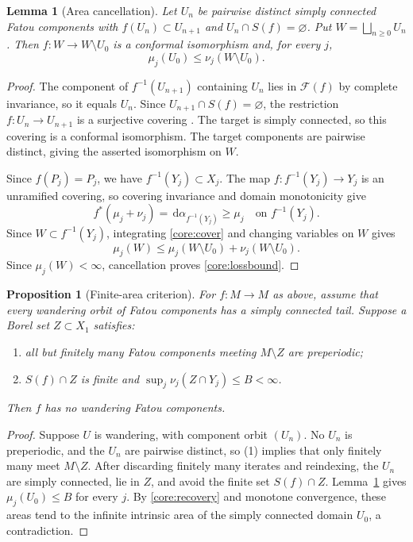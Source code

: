 \documentclass[11pt,reqno]{amsart}
\newcommand{\Fat}{\mathcal F}
\newcommand{\dd}{\,\mathrm d}
\newtheorem{proposition}[theorem]{Proposition}
\newtheorem{lemma}[theorem]{Lemma}
\theoremstyle{definition}
\numberwithin{equation}{section}
\begin{document}
\begin{lemma}[Area cancellation]\label{core:tail}
Let $U_n$ be pairwise distinct simply connected Fatou components with
$f(U_n)\subset U_{n+1}$ and $U_n\cap S(f)=\varnothing$.
Put $W=\bigsqcup_{n\ge0}U_n$. Then $f:W\to W\setminus U_0$ is a
conformal isomorphism and, for every $j$,
\begin{equation}\label{core:lossbound}
 \mu_j(U_0)\le\nu_j(W\setminus U_0).
\end{equation}
\end{lemma}
\begin{proof}
The component of $f^{-1}(U_{n+1})$ containing $U_n$ lies in $\Fat(f)$
by complete invariance, so it equals $U_n$. Since
$U_{n+1}\cap S(f)=\varnothing$, the restriction $f:U_n\to U_{n+1}$
is a surjective covering \cite[Section~3.2]{Sixsmith}.
The target is simply connected, so this covering is a conformal
isomorphism. The target components are pairwise distinct, giving the
asserted isomorphism on $W$.

Since $f(P_j)=P_j$, we have $f^{-1}(Y_j)\subset X_j$.
The map $f:f^{-1}(Y_j)\to Y_j$ is an unramified covering, so
covering invariance and domain monotonicity give
\begin{equation}\label{core:cover}
 f^*(\mu_j+\nu_j)=\dd\alpha_{f^{-1}(Y_j)}\ge\mu_j
 \quad\text{on }f^{-1}(Y_j).
\end{equation}
Since $W\subset f^{-1}(Y_j)$, integrating \eqref{core:cover} and
changing variables on $W$ gives
\[
 \mu_j(W)\le\mu_j(W\setminus U_0)+\nu_j(W\setminus U_0).
\]
Since $\mu_j(W)<\infty$, cancellation proves \eqref{core:lossbound}.
\end{proof}

\begin{proposition}[Finite-area criterion]\label{core:global}
For $f:M\to M$ as above, assume that every wandering orbit of Fatou
components has a simply connected tail. Suppose a Borel set
$Z\subset X_1$ satisfies:
\begin{enumerate}
 \item all but finitely many Fatou components meeting $M\setminus Z$
 are preperiodic;
 \item $S(f)\cap Z$ is finite and
 $\sup_j\nu_j(Z\cap Y_j)\le B<\infty$.
\end{enumerate}
Then $f$ has no wandering Fatou components.
\end{proposition}
\begin{proof}
Suppose $U$ is wandering, with component orbit $(U_n)$.
No $U_n$ is preperiodic, and the $U_n$ are pairwise distinct, so (1)
implies that only finitely many meet $M\setminus Z$.
After discarding finitely many iterates and reindexing, the $U_n$ are
simply connected, lie in $Z$, and avoid the finite set $S(f)\cap Z$.
Lemma~\ref{core:tail} gives $\mu_j(U_0)\le B$ for every $j$.
By \eqref{core:recovery} and monotone convergence, these areas tend
to the infinite intrinsic area of the simply connected domain $U_0$,
a contradiction.
\end{proof}
\end{document}
